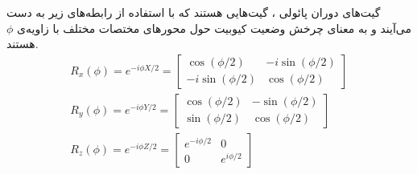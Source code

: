 گیت‌های دوران پائولی ، گیت‌هایی هستند که با استفاده از رابطه‌های زیر به دست می‌آیند و به معنای چرخش وضعیت کیوبیت حول محورهای مختصات مختلف با زاویه‌ی 
$\phi$
هستند.
\begin{equation}
\begin{gathered}
    R_x(\phi) = e^{-i \phi X/2} = 
            \begin{bmatrix}
                \cos(\phi/2) & -i\sin(\phi/2) \\
                -i\sin(\phi/2) & \cos(\phi/2)
            \end{bmatrix}
            \\[3pt]
    R_y(\phi) = e^{-i\phi Y/2} = 
            \begin{bmatrix}
                \cos(\phi/2) & -\sin(\phi/2) \\
                \sin(\phi/2) & \cos(\phi/2)
            \end{bmatrix}
            \\[3pt]
    R_z(\phi) = e^{-i\phi Z/2} = \begin{bmatrix}
                e^{-i\phi/2} & 0 \\
                0 & e^{i\phi/2}
            \end{bmatrix}
\end{gathered}
\end{equation}

